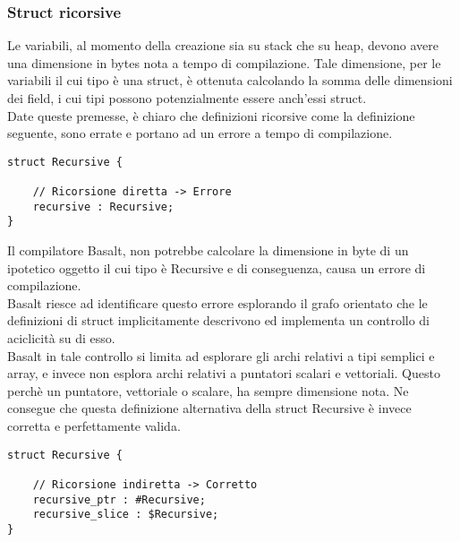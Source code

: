 \subsubsection{Struct ricorsive}
Le variabili, al momento della creazione sia su stack che su heap, devono avere una dimensione 
in bytes nota a tempo di compilazione. Tale dimensione, per le variabili il cui tipo è una struct, 
è ottenuta calcolando la somma delle dimensioni dei field, i cui tipi possono potenzialmente 
essere anch’essi struct. \\ 

Date queste premesse, è chiaro che definizioni ricorsive come la definizione seguente, 
sono errate e portano ad un errore a tempo di compilazione. \\

\vspace{0.5cm}
\begin{lstlisting}[frame=single]
struct Recursive {

    // Ricorsione diretta -> Errore
    recursive : Recursive;
}
\end{lstlisting}
\vspace{0.5cm}

 
Il compilatore Basalt, non potrebbe calcolare la dimensione in byte di un ipotetico oggetto il cui tipo è 
Recursive e di conseguenza, causa un errore di compilazione. \\ 

Basalt riesce ad identificare questo errore esplorando il grafo orientato che le definizioni di struct implicitamente 
descrivono ed implementa un controllo di aciclicità su di esso. \\

Basalt in tale controllo si limita ad esplorare gli archi relativi a tipi semplici e array, 
e invece non esplora archi relativi a puntatori scalari e vettoriali. Questo perchè un puntatore, 
vettoriale o scalare, ha sempre dimensione nota. Ne consegue che questa definizione alternativa 
della struct Recursive è invece corretta e perfettamente valida. \\

\vspace{0.5cm}
\begin{lstlisting}[frame=single]
struct Recursive {

    // Ricorsione indiretta -> Corretto
    recursive_ptr : #Recursive;
    recursive_slice : $Recursive;
}
\end{lstlisting}
\vspace{0.5cm}